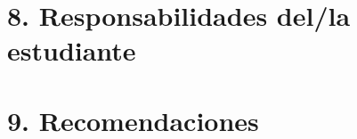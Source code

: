 \documentclass[letter,11pt]{article}
\begin{document}
    \newpage
    \section*{8. Responsabilidades del/la estudiante}
    \responsabilidadesEstudiantes
    

    \newpage
    \section*{9. Recomendaciones}
    \recomendacionesEstudiantes
    
\end{document}
